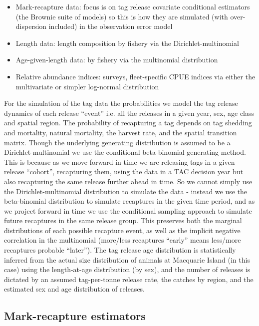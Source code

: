 \documentclass[12pt,a4paper,twoside,times,sky,standard]{csiroreport2017}
\begin{document}
\begin{itemize}
    \item Mark-recapture data: focus is on tag release covariate conditional estimators (the Brownie suite of models) so this is how they are simulated (with over-dispersion included) in the observation error model
    \item Length data: length composition by fishery via the Dirichlet-multinomial
    \item Age-given-length data: by fishery via the multinomial distribution
    \item Relative abundance indices: surveys, fleet-specific CPUE indices via either the multivariate or simpler log-normal distribution
\end{itemize}

For the simulation of the tag data the probabilities we model the tag release dynamics of each release ``event'' i.e. all the releases in a given year, sex, age class and spatial region. The probability of recapturing a tag depends on tag shedding and mortality, natural mortality, the harvest rate, and the spatial transition matrix. Though the underlying generating distribution is assumed to be a Dirichlet-multinomial we use the conditional beta-binomial generating method. This is because as we move forward in time we are releasing tags in a given release ``cohort'', recapturing them, using the data in a TAC decision year but also recapturing the same release further ahead in time. So we cannot simply use the Dirichlet-multinomial distribution to simulate the data - instead we use the beta-binomial distribution to simulate recaptures in the given time period, and as we project forward in time we use the conditional sampling approach to simulate future recaptures in the same release group. This preserves both the marginal distributions of each possible recapture event, as well as the implicit negative correlation in the multinomial (more/less recaptures ``early'' means less/more recaptures probable ``later''). The tag release age distribution is statistically inferred from the actual size distribution of animals at Macquarie Island (in this case) using the length-at-age distribution (by sex), and the number of releases is dictated by an assumed tag-per-tonne release rate, the catches by region, and the estimated sex and age distribution of releases.

\subsection{Mark-recapture estimators}
\end{document}
